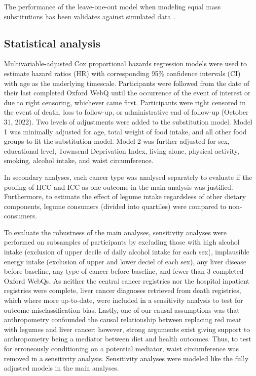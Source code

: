 \documentclass[sn-basic,Numbered,iicol,pdflatex]{sn-jnl}
\begin{document}
\noindent The performance of the leave-one-out model when modeling equal
mass substitutions has been validates against simulated data
\citep{Tomova2022}.

\hypertarget{subsec6}{%
\subsection{Statistical analysis}\label{subsec6}}

Multivariable-adjusted Cox proportional hazards regression models were
used to estimate hazard ratios (HR) with corresponding 95\% confidence
intervals (CI) with age as the underlying timescale. Participants were
followed from the date of their last completed Oxford WebQ until the
occurrence of the event of interest or due to right censoring, whichever
came first. Participants were right censored in the event of death, loss
to follow-up, or administrative end of follow-up (October 31, 2022). Two
levels of adjustments were added to the substitution model. Model 1 was
minimally adjusted for age, total weight of food intake, and all other
food groups to fit the substitution model. Model 2 was further adjusted
for sex, educational level, Townsend Deprivation Index, living alone,
physical activity, smoking, alcohol intake, and waist circumference.

In secondary analyses, each cancer type was analysed separately to
evaluate if the pooling of HCC and ICC as one outcome in the main
analysis was justified. Furthermore, to estimate the effect of legume
intake regardsless of other dietary components, legume consumers
(divided into quartiles) were compared to non-consumers.

To evaluate the robustness of the main analyses, sensitivity analyses
were performed on subsamples of participants by excluding those with
high alcohol intake (exclusion of upper decile of daily alcohol intake
for each sex), implausible energy intake (exclusion of upper and lower
deciel of each sex), any liver disease before baseline, any type of
cancer before baseline, and fewer than 3 completed Oxford WebQs. As
neither the central cancer registries nor the hospital inpatient
registries were complete, liver cancer diagnoses retrieved from death
registries, which where more up-to-date, were included in a sensitivity
analysis to test for outcome misclassification bias. Lastly, one of our
causal assumptions was that anthropometry confounded the causal
relationship between replacing red meat with legumes and liver cancer;
however, strong arguments exist giving support to anthropometry being a
mediator between diet and health outcomes. Thus, to test for erroneously
conditioning on a potential mediator, waist circumference was removed in
a sensitivity analysis. Sensitivity analyses were modeled like the fully
adjusted models in the main analyses.
\end{document}
